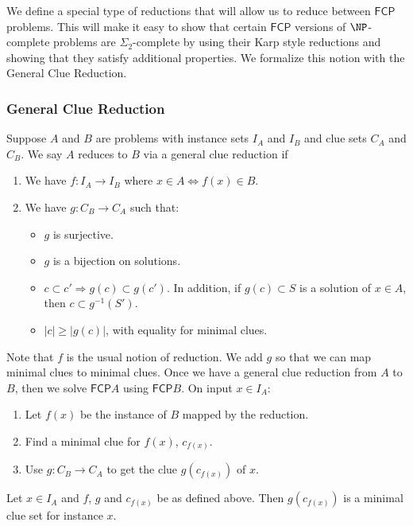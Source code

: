 \documentclass[runningheads,a4paper]{llncs}
\begin{document}
We define a special type of reductions that will allow us to reduce between $\mathsf{FCP}$ problems. This will make it easy to show that certain $\mathsf{FCP}$ versions of $\NP$-complete problems are $\Sigma_2$-complete by using their Karp style reductions and showing that they satisfy additional properties. We formalize this notion with the General Clue Reduction.

\subsubsection{General Clue Reduction}

\begin{definition}
Suppose $A$ and $B$ are problems with instance sets $I_A$ and $I_B$ and clue sets $C_A$ and $C_B$. We say $A$ reduces to $B$ via a general clue reduction if
\begin{enumerate}
\item We have $f: I_A \rightarrow I_B$ where $x \in A \iff f(x) \in B$.
\item We have $g: C_B \rightarrow C_A$ such that:
\begin{itemize}
\item $g$ is surjective. 
\item $g$ is a bijection on solutions.
\item $c \subset c' \Rightarrow g(c) \subset g(c')$. In addition, if $g(c) \subset S$ is a solution of $x \in A$, then $c \subset g^{-1}(S')$.
\item $|c| \geq |g(c)|$, with equality for minimal clues. 
\end{itemize}
\end{enumerate}
\end{definition}
Note that $f$ is the usual notion of reduction. We add $g$ so that we can map minimal clues to minimal clues. Once we have a general clue reduction from $A$ to $B$, then we solve $\mathsf{FCP} A$ using $\mathsf{FCP} B$. On input $x \in I_A$:
\begin{enumerate}
\item Let $f(x)$ be the instance of $B$ mapped by the reduction.
\item Find a minimal clue for $f(x)$, $c_{f(x)}$. 
\item Use $g: C_B \rightarrow C_A$ to get the clue $g(c_{f(x)})$ of $x$.
\end{enumerate}

\begin{lemma}
Let $x \in I_A$ and $f$, $g$ and $c_{f(x)}$ be as defined above. Then $g(c_{f(x)})$ is a minimal clue set for instance $x$.
\end{lemma}
\end{document}
